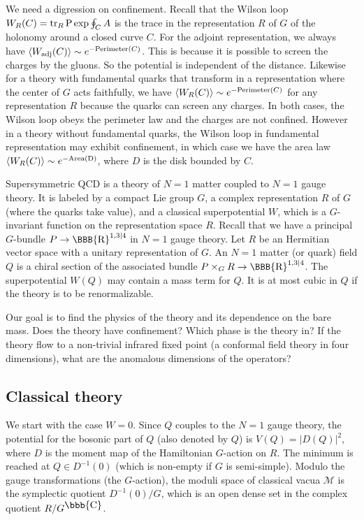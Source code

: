 \documentclass[lecture]{qft-l}
\newcommand{\RE}{{\mbox{\BBB{R}}}}
\newcommand{\co}{{\mbox{\bbb{C}}}}
\newcommand{\bra}{\langle}
\newcommand{\ket}{\rangle}
\newcommand{\e}[1]{e^{{#1}}}
\newcommand{\tr}{{\rm tr}}
\newcommand{\MM}{{\mathcal M}}
\numberwithin{figure}{chapter}
\begin{document}
We need a digression on confinement.
Recall that the Wilson loop $W_R(C)=\tr_R\,{\rm P}\exp\oint_CA$
is the trace in the representation $R$ of $G$ of the holonomy around
a closed curve $C$.
For the adjoint representation, we always have
$\bra W_{{\rm adj}}(C)\ket\sim\e{-{{\rm Perimeter}}(C)}$.
This is because it is possible to screen the charges by the gluons.
So the potential is independent of the distance.
Likewise for a theory with fundamental quarks that transform in 
a representation where the center of $G$ acts faithfully,
we have $\bra W_R(C)\ket\sim\e{-{{\rm Perimeter}}(C)}$
for any representation $R$ because the quarks can screen any charges.
In both cases, the Wilson loop obeys the perimeter law and 
the charges are not confined.
However in a theory without fundamental quarks, the Wilson loop in 
fundamental representation may exhibit confinement, in which case we
have the area law $\bra W_R(C)\ket\sim\e{-{{\rm Area(D)}}}$,
where $D$ is the disk bounded by $C$.


Supersymmetric QCD is a theory of $N=1$ matter coupled to $N=1$ gauge theory.
It is labeled by a compact Lie group $G$, a complex representation $R$ of $G$ 
(where the quarks take value), and a classical superpotential $W$, which is
a $G$-invariant function on the representation space $R$.
Recall that we have a principal $G$-bundle $P\to\RE^{1,3|4}$ in $N=1$ 
gauge theory.
Let $R$ be an Hermitian vector space with a unitary representation of $G$.
An $N=1$ matter (or quark) field $Q$ is a chiral section of 
the associated bundle $P\times_GR\to\RE^{1,3|4}$.
The superpotential $W(Q)$ may contain a mass term for $Q$.
It is at most cubic in $Q$ if the theory is to be renormalizable.

Our goal is to find the physics of the theory
and its dependence on the bare mass.
Does the theory have confinement?
Which phase is the theory in?
If the theory flow to a non-trivial infrared fixed point (a conformal field 
theory in four dimensions), what are the anomalous dimensions of the operators?

\subsection{Classical theory}

We start with the case $W=0$.
Since $Q$ couples to the $N=1$ gauge theory, the potential for 
the bosonic part of $Q$ (also denoted by $Q$) is $V(Q)=|D(Q)|^2$, 
where $D$ is the moment map of the Hamiltonian $G$-action on $R$.
The minimum is reached at $Q\in D^{-1}(0)$ (which is non-empty if $G$ is 
semi-simple).
Modulo the gauge transformations (the $G$-action), the moduli space 
of classical vacua $\MM$ is the symplectic quotient $D^{-1}(0)/G$,
which is an open dense set in the complex quotient $R/G^\co$.
\end{document}
